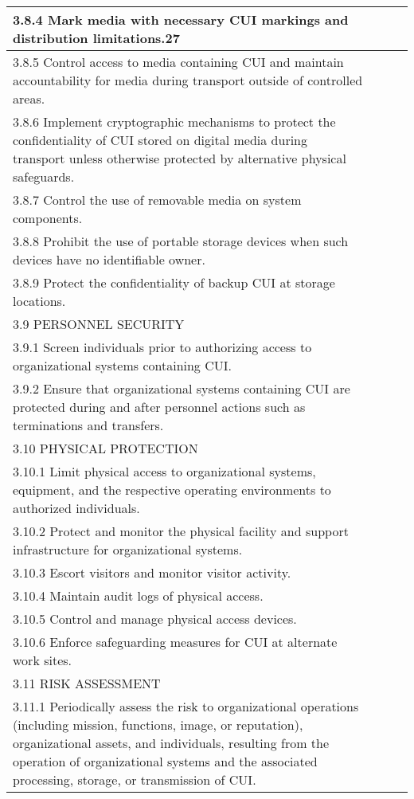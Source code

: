 \begin{longtable} {|p{}|p{}|p{}|p{} |}
{3.8.4 Mark media with necessary CUI markings and distribution limitations.27}&&& \\ \hline
{3.8.5 Control access to media containing CUI and maintain accountability for media during transport outside of controlled areas.}&&& \\ \hline
{3.8.6 Implement cryptographic mechanisms to protect the confidentiality of CUI stored on digital media during transport unless otherwise protected by alternative physical safeguards.}&&& \\ \hline
{3.8.7 Control the use of removable media on system components.}&&& \\ \hline
{3.8.8 Prohibit the use of portable storage devices when such devices have no identifiable owner.}&&& \\ \hline
{3.8.9 Protect the confidentiality of backup CUI at storage locations.}&&& \\ \hline
{3.9 PERSONNEL SECURITY}&&& \\ \hline
{3.9.1 Screen individuals prior to authorizing access to organizational systems containing CUI.}&&& \\ \hline
{3.9.2 Ensure that organizational systems containing CUI are protected during and after personnel actions such as terminations and transfers.}&&& \\ \hline
{3.10 PHYSICAL PROTECTION}&&& \\ \hline
{3.10.1 Limit physical access to organizational systems, equipment, and the respective operating environments to authorized individuals.}&&& \\ \hline
{3.10.2 Protect and monitor the physical facility and support infrastructure for organizational systems.}&&& \\ \hline
{3.10.3 Escort visitors and monitor visitor activity.}&&& \\ \hline
{3.10.4 Maintain audit logs of physical access.}&&& \\ \hline
{3.10.5 Control and manage physical access devices.}&&& \\ \hline
{3.10.6 Enforce safeguarding measures for CUI at alternate work sites.}&&& \\ \hline
{3.11 RISK ASSESSMENT}&&& \\ \hline
{3.11.1 Periodically assess the risk to organizational operations (including mission, functions, image, or reputation), organizational assets, and individuals, resulting from the operation of organizational systems and the associated processing, storage, or transmission of CUI.}&&& \\ \hline

\end{longtable}
